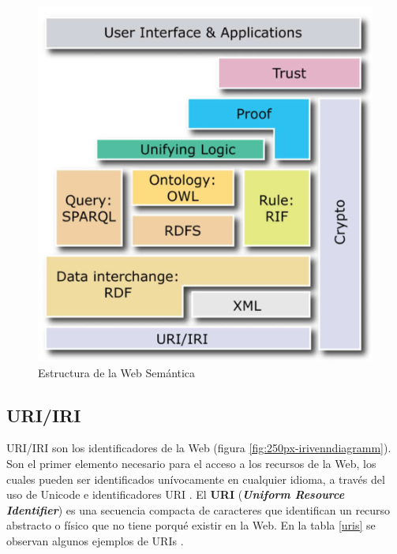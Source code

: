 \begin{figure}[H]
	\centering
	\includegraphics[width=0.52\linewidth]{imagenes/capitulo3/arquitectura2}
	\caption{Estructura de la Web Semántica \cite{apuntes-clase-jose}}
	\label{fig:arquitectura2}
\end{figure}



\subsection{URI/IRI}

URI/IRI son los identificadores de la Web (figura \ref{fig:250px-irivenndiagramm}). Son el primer elemento necesario para el acceso a los recursos de la Web, los cuales pueden ser identificados unívocamente en cualquier idioma, a través del uso de Unicode e identificadores URI \cite{aplicacion}. El \textbf{URI} (\textit{\textbf{Uniform Resource Identifier}}) es una secuencia compacta de caracteres que identifican un recurso abstracto o físico que no tiene porqué existir en la Web. En la tabla \ref{uris} se observan algunos ejemplos de URIs \cite{uri}.


